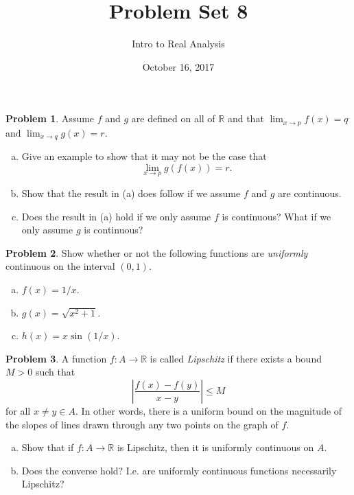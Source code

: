 \documentclass{amsart}
\newcommand{\+}[1]{\ensuremath{\mathbf{#1}}}
\newcommand{\R}{{\mathbb R}}
\theoremstyle{definition}
\newtheorem{prob}{Problem}
\begin{document}
\title{Problem Set 8}
\date{October 16, 2017}
\author{Intro to Real Analysis}

\maketitle

\begin{prob}
 Assume $f$ and $g$ are defined on all of $\R$
 and that $\lim_{x \to p} f(x) = q$
 and $\lim_{x \to q} g(x) = r$.
 \begin{enumerate}[(a)]
  \item Give an example to show that it may not be the case that
  \[\lim_{x \to p}g(f(x)) = r.\]
\item Show that the result in (a)
does follow if we assume $f$ and $g$
are continuous.
\item Does the result in (a)
hold if we only assume $f$ is continuous?
What if we only assume $g$ is continuous?
  \end{enumerate}
\end{prob}


\begin{prob}
Show whether or not the following functions are
\emph{uniformly} continuous on the interval $(0,1)$.
\begin{enumerate}[(a)]
 \item $f(x) = 1/x$.
 \item $g(x) = \sqrt{x^2 +1}$.
 \item $h(x) = x \sin(1/x)$.
\end{enumerate}
 \end{prob}
 

 \begin{prob}
  A function $f: A \to \R$ is called \emph{Lipschitz}
  if there exists a bound $M>0$ such that
  \[
  \left| \frac{f(x) - f(y)}{x-y} \right| \leq M
  \]
  for all $x \neq y \in A$.
  In other words, there is a uniform bound
  on the magnitude of the slopes of lines drawn
  through any two points on the graph of $f$.
  \begin{enumerate}[(a)]
   \item Show that if $f:A \to \R$
   is Lipschitz, then it is uniformly continuous on $A$.
   \item Does the converse hold? I.e. are uniformly continuous functions necessarily Lipschitz?
  \end{enumerate}
 \end{prob}

\end{document}
